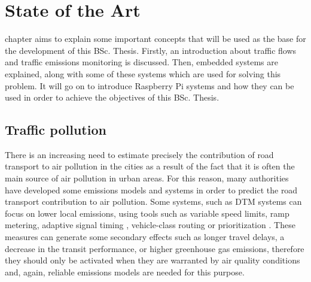 \chapter{State of the Art}
\label{chap:state_of_the_art}

 chapter aims to explain some important concepts that will be used as the base for the development of this \ac{BSc.} Thesis. Firstly, an introduction about traffic flows and traffic emissions monitoring is discussed. Then, embedded systems are explained, along with some of these systems which are used for solving this problem. It will go on to introduce Raspberry Pi systems and how they can be used in order to achieve the objectives of this \ac{BSc.} Thesis.

\section{Traffic pollution}

There is an increasing need to estimate precisely the contribution of road transport to air pollution in the cities as a result of the fact that it is often the main source of air pollution in urban areas. For this reason, many authorities have developed some emissions models and systems in order to predict the road transport contribution to air pollution. Some systems, such as \ac{DTM} systems can focus on lower local emissions, using tools such as variable speed limits, ramp metering, adaptive signal timing \cite{MK10}, vehicle-class routing or prioritization \cite{ZDHB09}. These measures can generate some secondary effects such as longer travel delays, a decrease in the transit performance, or higher greenhouse gas emissions, therefore they should only be activated when they are warranted by air quality conditions \cite{EMA09} and, again, reliable emissions models are needed for this purpose. 

